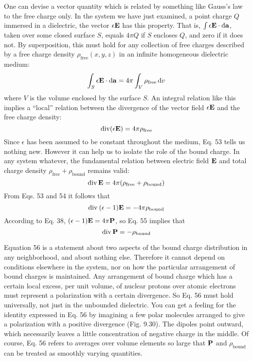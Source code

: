 One can devise a vector quantity which is related by something
like Gauss's law to the free charge only. In the system we have just
examined, a point charge $Q$ immersed in a dielectric, the vector $\epsilon\mathbf{E}$
has this property. That is, $\int\epsilon\mathbf{E}\cdot\operatorname{d\!}\mathbf{a}$, taken over some closed surface $S$,
equals $4\pi Q$ if $S$ encloses $Q$, and zero if it does not. By superposition,
this must hold for any collection of free charges described by a free
charge density $\rho_\text{free}(x,y,z)$ in an infinite homogeneous dielectric
medium:
\begin{equation}
  \int_S \epsilon\mathbf{E}\cdot\operatorname{d\!}\mathbf{a} = 4\pi\int_V\rho_\text{free}\operatorname{d\!} v
\end{equation}
where $V$ is the volume enclosed by the surface $S$. An integral relation
like this implies a ``local'' relation between the divergence of
the vector field $\epsilon\mathbf{E}$ and the free charge density:
\begin{equation}
  \operatorname{div}(\epsilon\mathbf{E}) = 4\pi\rho_\text{free}
\end{equation}
Since $\epsilon$ has been assumed to be constant throughout the medium,
Eq. 53 tells us nothing new. However it can help us to isolate the
role of the bound charge. In any system whatever, the fundamental
relation between electric field $\mathbf{E}$ and total charge density 
$\rho_\text{free}+\rho_\text{bound}$
remains valid:
\begin{equation}
  \operatorname{div}\mathbf{E} = 4\pi(\rho_\text{free}+\rho_\text{bound})
\end{equation}
From Eqs. 53 and 54 it follows that
\begin{equation}
  \operatorname{div}\:(\epsilon-1)\mathbf{E} = -4\pi\rho_\text{bound}
\end{equation}
According to Eq. 38, $(\epsilon-1)\mathbf{E}=4\pi\mathbf{P}$, so Eq. 55 implies that
\begin{equation}
  \operatorname{div}\mathbf{P} = -\rho_\text{bound}
\end{equation}

Equation 56 is a statement about two aspects of the bound charge
distribution in any neighborhood, and about nothing else. 
Therefore it cannot depend on conditions elsewhere in the system, nor
on how the particular arrangement of bound charges is maintained.
Any arrangement of bound charge which has a certain local excess,
per unit volume, of nuclear protons over atomic electrons must
represent a polarization with a certain divergence. So Eq. 56 must
hold universally, not just in the unbounded dielectric. You can get
a feeling for the identity expressed in Eq. 56 by imagining a few polar
molecules arranged to give a polarization with a positive divergence
(Fig. 9.30). The dipoles point outward, which necessarily leaves a
little concentration of negative charge in the middle. Of course,
Eq. 56 refers to averages over volume elements so large that $\mathbf{P}$ and
$\rho_\text{bound}$ can be treated as smoothly varying quantities.

